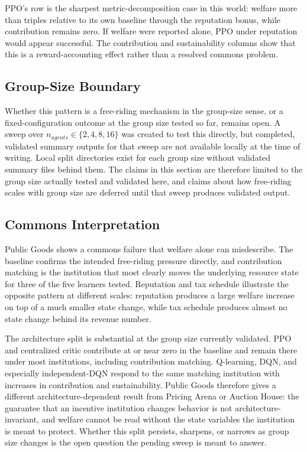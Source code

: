 \documentclass[11pt]{article}
\begin{document}
PPO's row is the sharpest metric-decomposition case in this world: welfare more
than triples relative to its own baseline through the reputation bonus, while
contribution remains zero. If welfare were reported alone, PPO under reputation
would appear successful. The contribution and sustainability columns show that
this is a reward-accounting effect rather than a resolved commons problem.

\subsection{Group-Size Boundary}

Whether this pattern is a free-riding mechanism in the group-size sense, or a
fixed-configuration outcome at the group size tested so far, remains open. A
sweep over \(n_{agents} \in \{2,4,8,16\}\) was created to test this directly,
but completed, validated summary outputs for that sweep are not available
locally at the time of writing. Local split directories exist for each group
size without validated summary files behind them. The claims in this section
are therefore limited to the group size actually tested and validated here, and
claims about how free-riding scales with group size are deferred until that
sweep produces validated output.

\subsection{Commons Interpretation}

Public Goods shows a commons failure that welfare alone can misdescribe. The
baseline confirms the intended free-riding pressure directly, and contribution
matching is the institution that most clearly moves the underlying resource
state for three of the five learners tested. Reputation and tax schedule
illustrate the opposite pattern at different scales: reputation produces a
large welfare increase on top of a much smaller state change, while tax schedule
produces almost no state change behind its revenue number.

The architecture split is substantial at the group size currently validated.
PPO and centralized critic contribute at or near zero in the baseline and remain
there under most institutions, including contribution matching. Q-learning,
DQN, and especially independent-DQN respond to the same matching institution
with increases in contribution and sustainability. Public Goods therefore gives
a different architecture-dependent result from Pricing Arena or Auction House:
the guarantee that an incentive institution changes behavior is
not architecture-invariant, and welfare cannot be read without the state
variables the institution is meant to protect. Whether this split persists,
sharpens, or narrows as group size changes is the open question the pending
sweep is meant to answer.
\end{document}
